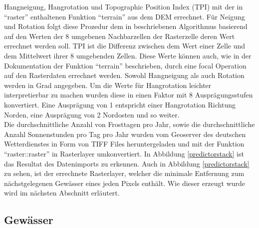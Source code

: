 Hangneigung, Hangrotation und Topographic Position Index (TPI) mit der in ``raster'' enthaltenen Funktion ``terrain'' aus dem DEM errechnet. Für Neigung und Rotation folgt diese Prozedur dem in \cite{hillshading} beschriebenen Algorithmus basierend auf den Werten der 8 umgebenen Nachbarzellen der Rasterzelle deren Wert errechnet werden soll. TPI ist die Differenz zwischen dem Wert einer Zelle und dem Mittelwert ihrer 8 umgebenden Zellen. Diese Werte können auch, wie in der Dokumentation der Funktion ``terrain'' beschrieben, durch eine focal Operation auf den Rasterdaten errechnet werden. \cite{terraindoku} Sowohl Hangneigung als auch Rotation werden in Grad angegeben. Um die Werte für Hangrotation leichter interpretierbar zu machen wurden diese in einen Faktor mit 8 Ausprägungsstufen konvertiert. Eine Ausprägung von 1 entspricht einer Hangrotation Richtung Norden, eine Ausprägung von 2 Nordosten und so weiter. \\
Die durchschnittliche Anzahl von Frosttagen pro Jahr, sowie die durchschnittliche Anzahl Sonnenstunden pro Tag pro Jahr wurden vom Geoserver des deutschen Wetterdienstes in Form von TIFF Files heruntergeladen und mit der Funktion ``raster::raster'' in Rasterlayer umkonvertiert.\cite{frosttage} \cite{sonnenstunden} In Abbildung \ref{predictorstack} ist das Resultat des Datenimports zu erkennen. Auch in Abbildung \ref{predictorstack} zu sehen, ist der errechnete Rasterlayer, welcher die minimale Entfernung zum nächstgelegenen Gewässer eines jeden Pixels enthält. Wie dieser erzeugt wurde wird im nächsten Abschnitt erläutert. 

\subsection{Gewässer}

